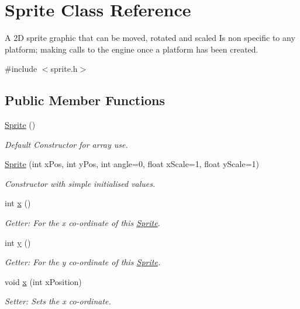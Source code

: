 \hypertarget{class_sprite}{\section{Sprite Class Reference}
\label{class_sprite}
}


A 2\-D sprite graphic that can be moved, rotated and scaled Is non specific to any platform; making calls to the engine once a platform has been created.  




{\ttfamily \#include $<$sprite.\-h$>$}

\subsection*{Public Member Functions}
\begin{DoxyCompactItemize}
\item 
\hyperlink{class_sprite_a12cba3ac1868418add3c4d95ce87e615}{Sprite} ()
\begin{DoxyCompactList}\small\item\em Default Constructor for array use. \end{DoxyCompactList}\item 
\hyperlink{class_sprite_a9e3a21ed23d34859c74680cc18052838}{Sprite} (int x\-Pos, int y\-Pos, int angle=0, float x\-Scale=1, float y\-Scale=1)
\begin{DoxyCompactList}\small\item\em Constructor with simple initialised values. \end{DoxyCompactList}\item 
int \hyperlink{class_sprite_a94fe4c517497ba88a93b73cde72b29e8}{x} ()
\begin{DoxyCompactList}\small\item\em Getter\-: For the x co-\/ordinate of this \hyperlink{class_sprite}{Sprite}. \end{DoxyCompactList}\item 
int \hyperlink{class_sprite_a2c5cebdd000b4c406432da3ce3a71cd6}{y} ()
\begin{DoxyCompactList}\small\item\em Getter\-: For the y co-\/ordinate of this \hyperlink{class_sprite}{Sprite}. \end{DoxyCompactList}\item 
void \hyperlink{class_sprite_ad8d8da2bddcc3819ad6c1c43384b0349}{x} (int x\-Position)
\begin{DoxyCompactList}\small\item\em Setter\-: Sets the x co-\/ordinate. \end{DoxyCompactList}\item 

\end{DoxyCompactItemize}
